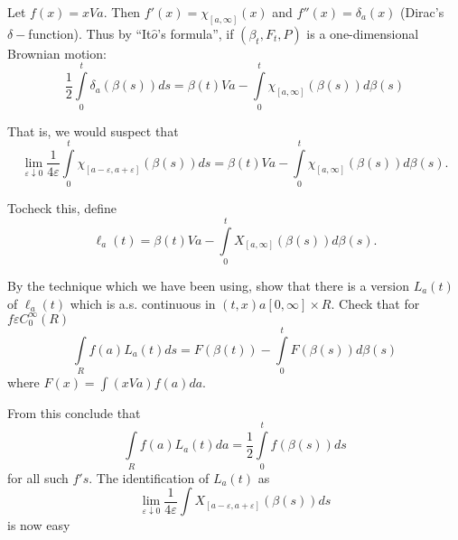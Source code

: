 \setcounter{exercise}{8}
\begin{exercise} %
Let $f(x) = x Va$. Then $f'(x) = \chi_{[ a, \infty]}(x)$ and $f''(x) =
\delta_a(x)$ (Dirac's $\delta-$function). Thus by ``It$\hat{o}$'s
formula'', if $(\beta_t,F_t,P)$ is a one-dimensional Brownian motion:   
$$
\frac{1}{2} \int \limits^t_0 \delta_a (\beta(s))ds = \beta(t) Va -
\int \limits^t_0 \chi_{[ a, \infty]} (\beta(s))d \beta(s)  
$$

That is, we would suspect that 
$$
\lim_{\varepsilon \downarrow 0} \frac{1}{4 \varepsilon} \int
\limits^t_0 \chi_{[ a-\varepsilon, a+ \varepsilon]} (\beta(s))ds =
\beta(t)Va -\int \limits^t_0 \chi_{[ a, \infty]} (\beta(s)) d
\beta(s). 
$$

To\pageoriginale check this, define 
$$
\ell_a(t) = \beta(t) Va- \int \limits^t_0 X_{[ a, \infty]}(\beta(s)) d \beta(s).
$$

By the technique which we have been using, show that there is a
version $L_a(t) $ of $\ell_a(t)$ which is a.s. continuous in $(t,x)a [
  0, \infty] \times R$. 
Check that for $f \varepsilon C^{\infty}_0 (R)$
$$
\int\limits_R f(a) L_a(t)ds = F(\beta(t)) - \int \limits^t_0
F(\beta(s)) d \beta(s) 
$$
where $F(x) = \int (xVa) f(a)da$.

From this conclude that 
$$
\int\limits_R f(a) L_a(t)da = \frac{1}{2} \int\limits^t_0
f(\beta(s)) ds 
$$
for all such $f's$. The identification of $L_a (t)$ as  
$$ 
\lim_{\varepsilon \downarrow 0} \frac{1}{4 \varepsilon} \int  X_{[
    a-\varepsilon, a+ \varepsilon]} (\beta(s))ds 
$$
is now easy
\end{exercise}

